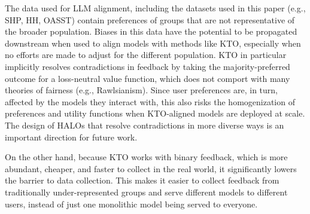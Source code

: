 The data used for LLM alignment, including the datasets used in this paper (e.g., SHP, HH, OASST) contain preferences of groups that are not representative of the broader population.
Biases in this data have the potential to be propagated downstream when used to align models with methods like KTO, especially when no efforts are made to adjust for the different population.
KTO in particular implicitly resolves contradictions in feedback by taking the majority-preferred outcome for a loss-neutral value function, which does not comport with many theories of fairness (e.g., Rawlsianism).
Since user preferences are, in turn, affected by the models they interact with, this also risks the homogenization of preferences and utility functions when KTO-aligned models are deployed at scale.
The design of HALOs that resolve contradictions in more diverse ways is an important direction for future work.

On the other hand, because KTO works with binary feedback, which is more abundant, cheaper, and faster to collect in the real world, it significantly lowers the barrier to data collection.
This makes it easier to collect feedback from traditionally under-represented groups and serve different models to different users, instead of just one monolithic model being served to everyone.

\newpage

